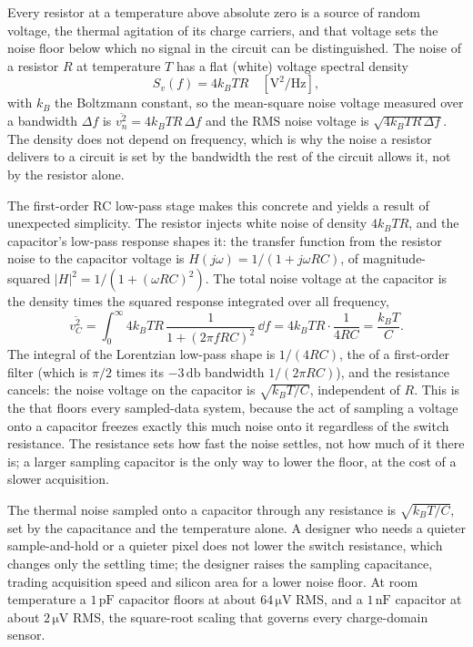 Every resistor at a temperature above absolute zero is a source of random
voltage, the thermal agitation of its charge carriers, and that voltage
sets the noise floor below which no signal in the circuit can be
distinguished. The  noise of a resistor $R$ at
temperature $T$ has a flat (white) voltage spectral density
\[
S_v(f) = 4k_B T R \quad [\si{\volt\squared\per\hertz}],
\]
with $k_B$ the Boltzmann constant, so the mean-square noise voltage
measured over a bandwidth $\Delta f$ is $\overline{v_n^{2}} = 4k_B T
R\,\Delta f$ and the RMS noise voltage is $\sqrt{4k_B T R\,\Delta f}$. The
density does not depend on frequency, which is why the noise a resistor
delivers to a circuit is set by the bandwidth the rest of the circuit
allows it, not by the resistor alone.

The first-order RC low-pass stage makes this concrete and yields a result
of unexpected simplicity. The resistor injects white noise of density
$4k_B T R$, and the capacitor's low-pass response shapes it: the transfer
function from the resistor noise to the capacitor voltage is $H(j\omega) =
1/(1 + j\omega RC)$, of magnitude-squared $|H|^{2} = 1/(1 + (\omega
RC)^{2})$. The total noise voltage at the capacitor is the density times
the squared response integrated over all frequency,
\[
\overline{v_C^{2}} = \int_0^{\infty} 4k_B T R\,
\frac{1}{1 + (2\pi f RC)^{2}}\,\dd f
= 4k_B T R\cdot\frac{1}{4RC}
= \frac{k_B T}{C}.
\]
The integral of the Lorentzian low-pass shape is $1/(4RC)$, the
 of a first-order filter (which is $\pi/2$ times
its $-3\,\si{\decibel}$ bandwidth $1/(2\pi RC)$), and the resistance
cancels: the noise voltage on the capacitor is $\sqrt{k_B T/C}$,
independent of $R$. This is the  that floors every
sampled-data system, because the act of sampling a voltage onto a
capacitor freezes exactly this much noise onto it regardless of the switch
resistance. The resistance sets how fast the noise settles, not how much
of it there is; a larger sampling capacitor is the only way to lower the
floor, at the cost of a slower acquisition.

\begin{principle}
The thermal noise sampled onto a capacitor through any resistance is
$\sqrt{k_B T/C}$, set by the capacitance and the temperature alone. A
designer who needs a quieter sample-and-hold or a quieter pixel does not
lower the switch resistance, which changes only the settling time; the
designer raises the sampling capacitance, trading acquisition speed and
silicon area for a lower noise floor. At room temperature a
$1\,\si{\pico\farad}$ capacitor floors at about $64\,\si{\micro\volt}$
RMS, and a $1\,\si{\nano\farad}$ capacitor at about $2\,\si{\micro\volt}$
RMS, the square-root scaling that governs every charge-domain sensor.
\end{principle}

